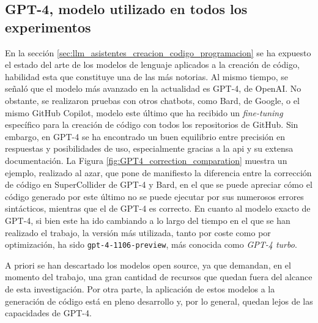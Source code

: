 \subsection{GPT-4, modelo utilizado en todos los experimentos}

En la sección \ref{sec:llm_asistentes_creacion_codigo_programacion} se ha expuesto el estado del arte de los modelos de lenguaje aplicados a la creación de código, habilidad esta que constituye una de las más notorias. Al mismo tiempo, se señaló que el modelo más avanzado en la actualidad es GPT-4, de OpenAI. No obstante, se realizaron pruebas con otros chatbots, como Bard, de Google, o el mismo GitHub Copilot, modelo este último que ha recibido un \emph{fine-tuning} específico para la creación de código con todos los repositorios de GitHub. Sin embargo, en GPT-4 se ha encontrado un buen equilibrio entre precisión en respuestas y posibilidades de uso, especialmente gracias a la \gls{api} y su extensa documentación. La Figura \ref{fig:GPT4_correction_comparation} muestra un ejemplo, realizado al azar, que pone de manifiesto la diferencia entre la corrección de código en SuperCollider de GPT-4 y Bard, en el que se puede apreciar cómo el código generado por este último no se puede ejecutar por sus numerosos errores sintácticos, mientras que el de GPT-4 es correcto. En cuanto al modelo exacto de GPT-4, si bien este ha ido cambiando a lo largo del tiempo en el que se han realizado el trabajo, la versión más utilizada, tanto por coste como por optimización, ha sido \texttt{gpt-4-1106-preview}, más conocida como \emph{GPT-4 turbo}.

A priori se han descartado los modelos open source, ya que demandan, en el momento del trabajo, una gran cantidad de recursos que quedan fuera del alcance de esta investigación. Por otra parte, la aplicación de estos modelos a la generación de código está en pleno desarrollo y, por lo general, quedan lejos de las capacidades de GPT-4.




